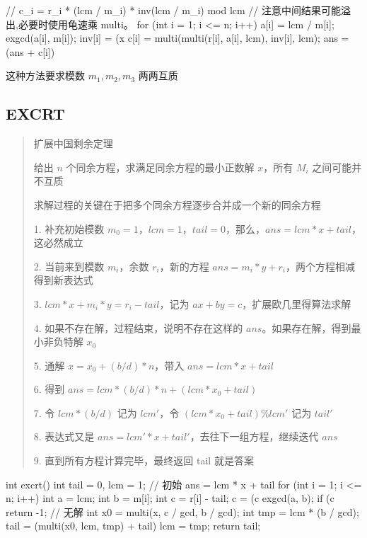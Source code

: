 \documentclass[UTF8,a4paper,11pt]{ctexart}
\begin{document}
\begin{CodeBlock}
// c_i = r_i * (lcm / m_i) * inv(lcm / m_i) mod lcm
// 注意中间结果可能溢出,必要时使用龟速乘 multi。
for (int i = 1; i <= n; i++) {
    a[i] = lcm / m[i];
    exgcd(a[i], m[i]);
    inv[i] = (x %
    c[i] = multi(multi(r[i], a[i], lcm), inv[i], lcm);
    ans = (ans + c[i]) %
}
\end{CodeBlock}

这种方法要求模数 $m_1,m_2,m_3$ 两两互质

\subsection{EXCRT}

\begin{quote}
扩展中国剩余定理\par
给出 $n$ 个同余方程，求满足同余方程的最小正数解 $x$，所有 $M_i$ 之间可能并不互质\par
\smallskip
求解过程的关键在于把多个同余方程逐步合并成一个新的同余方程\par
1. 补充初始模数 $m_0 = 1$，$lcm = 1$，$tail = 0$，那么，$ans = lcm * x + tail$，这必然成立\par
2. 当前来到模数 $m_i$，余数 $r_i$，新的方程 $ans = m_i * y + r_i$，两个方程相减得到新表达式\par
3. $lcm * x + m_i * y = r_i - tail$，记为 $ax + by = c$，扩展欧几里得算法求解\par
4. 如果不存在解，过程结束，说明不存在这样的 $ans$。如果存在解，得到最小非负特解 $x_0$\par
5. 通解 $x = x_0 + (b/d) * n$，带入 $ans = lcm * x + tail$\par
6. 得到 $ans = lcm * (b/d) * n + (lcm * x_0 + tail)$\par
7. 令 $lcm * (b/d)$ 记为 $lcm'$，令 $(lcm * x_0 + tail) \% lcm'$ 记为 $tail'$\par
8. 表达式又是 $ans = lcm' * x + tail'$，去往下一组方程，继续迭代 $ans$\par
9. 直到所有方程计算完毕，最终返回 tail 就是答案\par
\end{quote}

\begin{CodeBlock}
int excrt() {
    int tail = 0, lcm = 1;
    // 初始 ans = lcm * x + tail
    for (int i = 1; i <= n; i++) {
        int a = lcm;
        int b = m[i];
        int c = r[i] - tail;
        c = (c %
        exgcd(a, b);
        if (c %
            return -1; // 无解
        int x0 = multi(x, c / gcd, b / gcd);
        int tmp = lcm * (b / gcd);
        tail = (multi(x0, lcm, tmp) + tail) %
        lcm = tmp;
    }
    return tail;
}
\end{CodeBlock}
\end{document}
